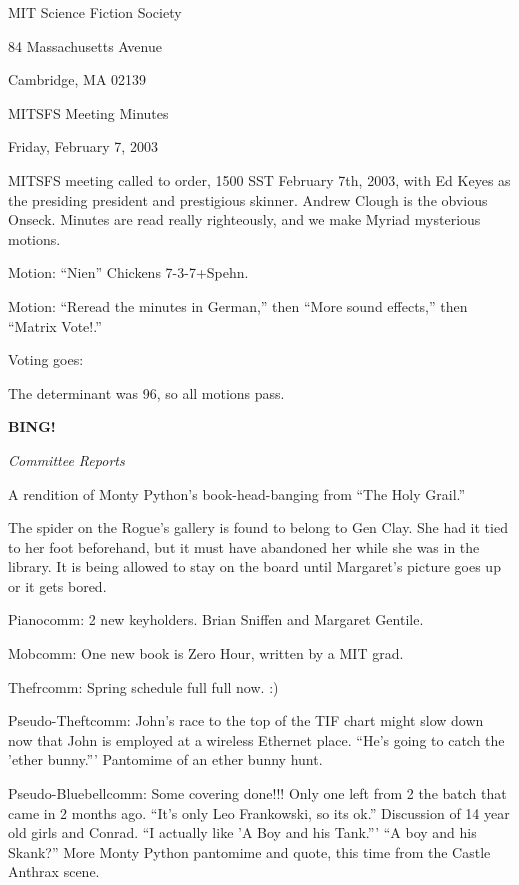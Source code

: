 \documentclass[12pt]{article}
\newcommand{\bing}{{\bf BING!} }
\newcommand{\goto}[1]{\bing \vskip 12pt \centerline{{\em{#1}}}}
\begin{document}
\begin{center}

MIT Science Fiction Society 

84 Massachusetts Avenue

Cambridge, MA 02139

\vspace{12pt}

MITSFS Meeting Minutes 

Friday, February 7, 2003

\end{center}
 
\vspace{18pt}

\setlength{\parskip}{6pt}

\noindent
MITSFS meeting called to order, 1500 SST February 7th, 2003, with Ed Keyes as the presiding president and prestigious skinner.  Andrew Clough is the obvious Onseck.  Minutes are read really righteously, and we make Myriad mysterious motions.

Motion:  ``Nien'' Chickens 7-3-7+Spehn.

Motion:  ``Reread the minutes in German,'' then ``More sound effects,'' then ``Matrix Vote!.''

Voting goes:

The determinant was 96, so all motions pass.

\goto{Committee Reports}

A rendition of Monty Python's book-head-banging from ``The Holy Grail.''

The spider on the Rogue's gallery is found to belong to Gen Clay.  She had it tied to her foot beforehand, but it must have abandoned her while she was in the library.  It is being allowed to stay on the board until Margaret's picture goes up or it gets bored.

Pianocomm:  2 new keyholders.  Brian Sniffen and Margaret Gentile.

Mobcomm:  One new book is Zero Hour, written by a MIT grad.

Thefrcomm:  Spring schedule full full now.  :)

Pseudo-Theftcomm:  John's race to the top of the TIF chart might slow down now that John is employed at a wireless Ethernet place.  ``He's going to catch the 'ether bunny.'''  Pantomime of an ether bunny hunt.

Pseudo-Bluebellcomm:  Some covering done!!!  Only one left from 2 the batch that came in 2 months ago.  ``It's only Leo Frankowski, so its ok.''  Discussion of 14 year old girls and Conrad.  ``I actually like 'A Boy and his Tank.'''  ``A boy and his Skank?''  More Monty Python pantomime and quote, this time from the Castle Anthrax scene.
\end{document}
